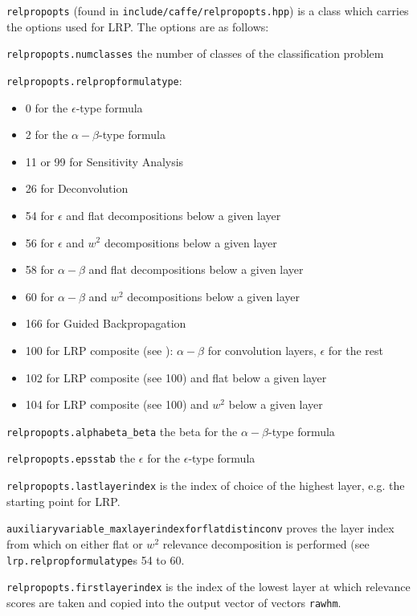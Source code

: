 \documentclass[a4wide]{article}
\begin{document}
\begin{itemize}
\texttt{relpropopts} (found in \texttt{include/caffe/relpropopts.hpp}) is a class which carries the options used for LRP. The options are as follows:

\texttt{relpropopts.numclasses} the number of classes of  the classification problem

\texttt{relpropopts.relpropformulatype}:
\begin{itemize}
\item 0 for the $\epsilon$-type formula
\item 2 for the $\alpha-\beta$-type formula
\item 11 or 99 for Sensitivity Analysis \cite{DBLP:journals/corr/SimonyanVZ13}
\item 26 for Deconvolution \cite{DBLP:conf/eccv/ZeilerF14}
\item 54 for $\epsilon$ and flat decompositions below a given layer
\item 56 for $\epsilon$ and $w^2$ decompositions below a given layer
\item 58 for $\alpha-\beta$ and flat decompositions below a given layer
\item 60 for $\alpha-\beta$ and $w^2$ decompositions below a given layer
\item 166 for Guided Backpropagation \cite{springenberg2014striving}
\item 100 for LRP composite (see \cite{kohlbrenner2019towards}): $\alpha-\beta$ for convolution layers, $\epsilon$ for the rest
\item 102 for LRP composite (see 100) and flat below a given layer
\item 104 for LRP composite (see 100) and $w^2$ below a given layer
\end{itemize}


\texttt{relpropopts.alphabeta\_beta} the beta for the $\alpha-\beta$-type formula

\texttt{relpropopts.epsstab} the $\epsilon$ for the $\epsilon$-type formula

\texttt{relpropopts.lastlayerindex} is the index of choice of the highest layer, e.g. the starting point for LRP.

\texttt{auxiliaryvariable\_maxlayerindexforflatdistinconv} proves the layer index from which on either flat or $w^2$ relevance decomposition is performed (see \texttt{lrp.relpropformulatype}s 54 to 60.

\texttt{relpropopts.firstlayerindex} is the index of the lowest layer at which relevance scores are taken and copied into the output vector of vectors \texttt{rawhm}.


\end{itemize}
\end{document}
